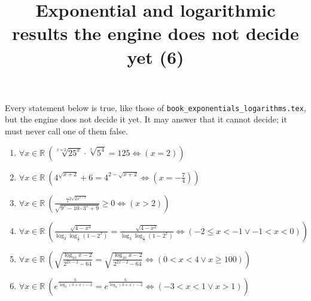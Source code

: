 \documentclass[11pt,a4paper]{article}
\title{Exponential and logarithmic results the engine does not decide yet (6)}
\author{}
\date{}
\begin{document}
\maketitle
Every statement below is true, like those of \texttt{book\_exponentials\_logarithms.tex}, but the engine does not decide it yet. It may answer that it cannot decide; it must never call one of them false.

\begin{enumerate}
\item $\displaystyle \forall x \in \mathbb{R}\ \left( \sqrt[x+2]{25^{x}} \cdot \sqrt[x]{5^{4}} = 125 \iff \left( x = 2 \right) \right)$
\item $\displaystyle \forall x \in \mathbb{R}\ \left( 4^{\sqrt{x+2}} + 6 = 4^{2 - \sqrt{x+2}} \iff \left( x = -\frac{7}{4} \right) \right)$
\item $\displaystyle \forall x \in \mathbb{R}\ \left( \frac{7^{2\sqrt{2x^{2-x}}}}{\sqrt{9^{x} - 10 \cdot 3^{x} + 9}} \ge 0 \iff \left( x > 2 \right) \right)$
\item $\displaystyle \forall x \in \mathbb{R}\ \left( \frac{\sqrt{4 - x^{2}}}{\log_{3}\log_{\frac{1}{2}}(1 - 2^{x})} = \frac{\sqrt{4 - x^{2}}}{\log_{3}\log_{\frac{1}{2}}(1 - 2^{x})} \iff \left( -2 \le x < -1 \lor -1 < x < 0 \right) \right)$
\item $\displaystyle \forall x \in \mathbb{R}\ \left( \sqrt{\frac{\log_{10} x - 2}{2^{2x-2} - 64}} = \sqrt{\frac{\log_{10} x - 2}{2^{2x-2} - 64}} \iff \left( 0 < x < 4 \lor x \ge 100 \right) \right)$
\item $\displaystyle \forall x \in \mathbb{R}\ \left( e^{\frac{6}{\log_{2}(3 + x) - 2}} = e^{\frac{6}{\log_{2}(3 + x) - 2}} \iff \left( -3 < x < 1 \lor x > 1 \right) \right)$
\end{enumerate}
\end{document}
